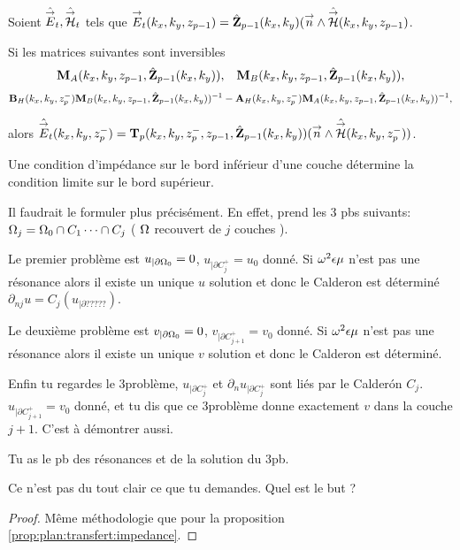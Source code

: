     \begin{prop}%
      \label{prop:plan:relevement:impedance}

      Soient \(\hat{{\overset{\rightarrow}{E}}}_t,\hat{{\overset{\rightarrow}{\mathcal{H}}}}_t\) tels que \({\overset{\rightarrow}{E}}_t(k_x,k_y,z_{p-1}) = \hat{\mathbf{Z}}_{p-1}(k_x,k_y)({\overset{\rightarrow}{n}} \wedge \hat{{\overset{\rightarrow}{\mathcal{H}}}}(k_x,k_y,z_{p-1})\).

      Si les matrices suivantes sont inversibles
      \begin{align*}
        \mathbf{M}_{A}(k_x,k_y,z_{p-1},\hat{\mathbf{Z}}_{p-1}(k_x,k_y)), && \mathbf{M}_{B}(k_x,k_y,z_{p-1},\hat{\mathbf{Z}}_{p-1}(k_x,k_y)),
      \end{align*}
      \begin{align*}
        \mathbf{B}_{H}(k_x,k_y,z_p^-)\mathbf{M}_{B}(k_x,k_y,z_{p-1},\hat{\mathbf{Z}}_{p-1}(k_x,k_y))^{-1} - \mathbf{A}_{H}(k_x,k_y,z_p^-)\mathbf{M}_{A}(k_x,k_y,z_{p-1},\hat{\mathbf{Z}}_{p-1}(k_x,k_y))^{-1},
      \end{align*}

      alors \(\hat{{\overset{\rightarrow}{E}}}_t(k_x,k_y,z_p^-) = \mathbf{T}_p(k_x,k_y,z_p^-,z_{p-1},\hat{\mathbf{Z}}_{p-1}(k_x,k_y))({\overset{\rightarrow}{n}} \wedge \hat{{\overset{\rightarrow}{\mathcal{H}}}}(k_x,k_y,z_p^-))\).

      Une condition d'impédance sur le bord inférieur d'une couche détermine la condition limite sur le bord supérieur.
    \end{prop}

    \begin{REM}
      Il faudrait le formuler plus précisément.
      En effet, prend les 3 pbs suivants: \(\Omega_j=\Omega_0\cap C_1 \dots \cap C_j\) ( \(\Omega\) recouvert de \(j\) couches ).
      
      Le premier problème est \(u_{|\partial \Omega_0} = 0\), \(u_{|\partial C_j^+} = u_0\) donné. Si \(\omega^2\epsilon\mu\) n'est pas une résonance alors il existe un unique \(u\) solution et donc le Calderon est déterminé \(\partial_{nj}u=C_j(u_{|\partial ????? })\).

      Le deuxième problème est \(v_{|\partial \Omega_0} = 0\), \(v_{|\partial C_{j+1}^+} = v_0\)  donné. Si \(\omega^2\epsilon\mu\) n'est pas une résonance alors il existe un unique \(v\) solution et donc le Calderon est déterminé.

      Enfin tu regardes le 3\ieme problème, \(u_{|\partial C_j^+}\) et \(\partial_{n} u_{|\partial C_j^+}\) sont liés par le Calderón \(C_j\). \(u_{|\partial C_{j+1}^+}=v_0\) donné, et tu dis que ce 3\ieme problème donne exactement \(v\) dans  la couche \(j+1\). C'est à démontrer aussi.

      Tu as le pb des résonances et de la solution du 3\ieme pb.
    \end{REM}
    \begin{REP}
      Ce n'est pas du tout clair ce que tu demandes. Quel est le but ?
    \end{REP}
    \begin{proof}
      Même méthodologie que pour la proposition \ref{prop:plan:transfert:impedance}.
    \end{proof}


